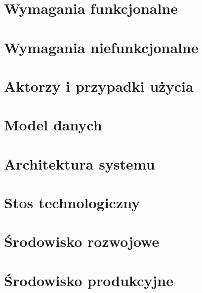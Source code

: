 

\section{Wymagania funkcjonalne}





\section{Wymagania niefunkcjonalne}





\section{Aktorzy i przypadki użycia}





\section{Model danych}





\section{Architektura systemu}





\section{Stos technologiczny}





\section{Środowisko rozwojowe}





\section{Środowisko produkcyjne}
